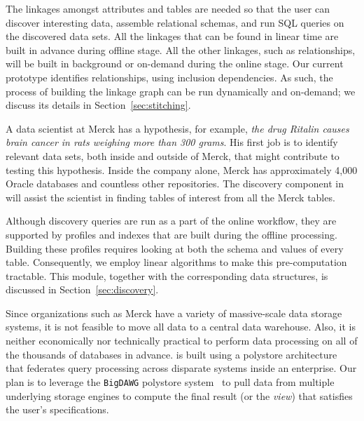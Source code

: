  The linkages amongst attributes and tables are needed so that the user can discover interesting data, assemble relational schemas, and run \textsf{SQL} queries on the discovered data sets. All the linkages that can be found in linear time are built in advance during offline stage. All the other linkages, such as \pkfk relationships, will be built in background or on-demand during the online stage. Our current prototype identifies \pkfk relationships, using inclusion dependencies. As such, the process of building the linkage graph can be run dynamically and on-demand; we discuss its details in Section~\ref{sec:stitching}.




\stitle{[Discovery.]} A data scientist at Merck has a hypothesis, for example, {\it the drug Ritalin causes brain cancer in rats weighing more than 300 grams}.
His first job is to identify relevant data sets, both inside and outside of Merck, that might contribute to testing this hypothesis. Inside the company alone, Merck has approximately 4,000 Oracle databases and countless other repositories. The discovery component in \dcv will assist the scientist in finding tables of interest from all the Merck tables.

Although discovery queries are run as a part of the online workflow, they are supported by profiles and indexes that are built during the offline processing.  Building these profiles requires looking at both the schema and values of every table. Consequently, we employ linear algorithms to make this pre-computation tractable. This module, together with the corresponding data structures, is discussed in Section~\ref{sec:discovery}.





Since organizations such as  Merck have a variety of massive-scale data storage systems, it is not feasible to move all data to a central data warehouse. Also, it is neither economically nor technically practical to perform data processing on all of the thousands of databases in advance. 
\dcv is built using a polystore architecture~\cite{DBLP:journals/sigmod/DugganESBHKMMMZ15} that federates query processing across disparate systems inside an enterprise. Our plan is to leverage the \texttt{BigDAWG} polystore system~\cite{DBLP:journals/pvldb/ElmoreDSBCGHHKK15} to pull data from multiple underlying storage engines to compute the final result (or the {\em view}) that satisfies the user's specifications.

